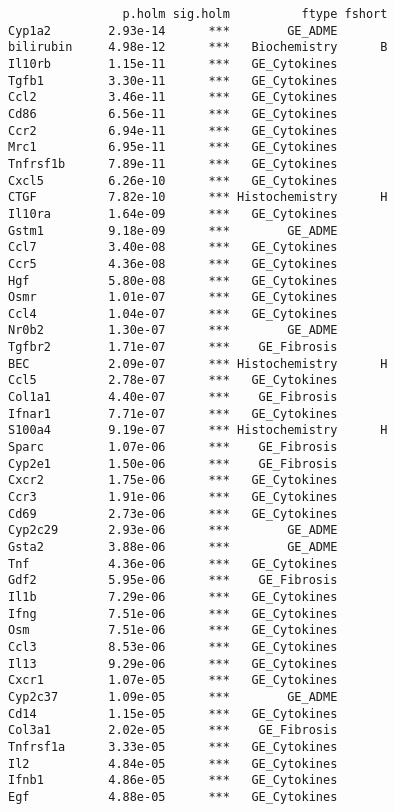 \documentclass[]{article}
\begin{document}
\begin{verbatim}
                p.holm sig.holm          ftype fshort
Cyp1a2        2.93e-14      ***        GE_ADME       
bilirubin     4.98e-12      ***   Biochemistry      B
Il10rb        1.15e-11      ***   GE_Cytokines       
Tgfb1         3.30e-11      ***   GE_Cytokines       
Ccl2          3.46e-11      ***   GE_Cytokines       
Cd86          6.56e-11      ***   GE_Cytokines       
Ccr2          6.94e-11      ***   GE_Cytokines       
Mrc1          6.95e-11      ***   GE_Cytokines       
Tnfrsf1b      7.89e-11      ***   GE_Cytokines       
Cxcl5         6.26e-10      ***   GE_Cytokines       
CTGF          7.82e-10      *** Histochemistry      H
Il10ra        1.64e-09      ***   GE_Cytokines       
Gstm1         9.18e-09      ***        GE_ADME       
Ccl7          3.40e-08      ***   GE_Cytokines       
Ccr5          4.36e-08      ***   GE_Cytokines       
Hgf           5.80e-08      ***   GE_Cytokines       
Osmr          1.01e-07      ***   GE_Cytokines       
Ccl4          1.04e-07      ***   GE_Cytokines       
Nr0b2         1.30e-07      ***        GE_ADME       
Tgfbr2        1.71e-07      ***    GE_Fibrosis       
BEC           2.09e-07      *** Histochemistry      H
Ccl5          2.78e-07      ***   GE_Cytokines       
Col1a1        4.40e-07      ***    GE_Fibrosis       
Ifnar1        7.71e-07      ***   GE_Cytokines       
S100a4        9.19e-07      *** Histochemistry      H
Sparc         1.07e-06      ***    GE_Fibrosis       
Cyp2e1        1.50e-06      ***    GE_Fibrosis       
Cxcr2         1.75e-06      ***   GE_Cytokines       
Ccr3          1.91e-06      ***   GE_Cytokines       
Cd69          2.73e-06      ***   GE_Cytokines       
Cyp2c29       2.93e-06      ***        GE_ADME       
Gsta2         3.88e-06      ***        GE_ADME       
Tnf           4.36e-06      ***   GE_Cytokines       
Gdf2          5.95e-06      ***    GE_Fibrosis       
Il1b          7.29e-06      ***   GE_Cytokines       
Ifng          7.51e-06      ***   GE_Cytokines       
Osm           7.51e-06      ***   GE_Cytokines       
Ccl3          8.53e-06      ***   GE_Cytokines       
Il13          9.29e-06      ***   GE_Cytokines       
Cxcr1         1.07e-05      ***   GE_Cytokines       
Cyp2c37       1.09e-05      ***        GE_ADME       
Cd14          1.15e-05      ***   GE_Cytokines       
Col3a1        2.02e-05      ***    GE_Fibrosis       
Tnfrsf1a      3.33e-05      ***   GE_Cytokines       
Il2           4.84e-05      ***   GE_Cytokines       
Ifnb1         4.86e-05      ***   GE_Cytokines       
Egf           4.88e-05      ***   GE_Cytokines       

\end{verbatim}
\end{document}
